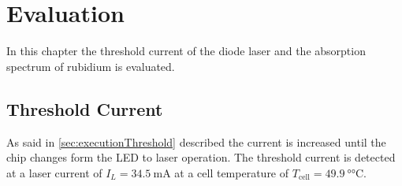 \section{Evaluation}
\label{sec:auswertung}

In this chapter the threshold current of the diode laser and the absorption spectrum of rubidium is evaluated. 

\subsection{Threshold Current}

As said in \autoref{sec:executionThreshold} described the current is increased until the chip changes form the LED to laser operation.
The threshold current is detected at a laser current of $I_L = \SI{34.5}{\milli\ampere}$ at a cell temperature of $T_\text{cell} = \SI{49.9}{\degree\celsius}$.


